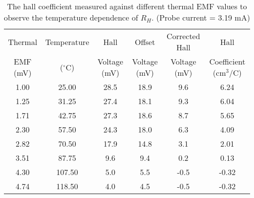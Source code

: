 \begin{table*}[]
    \centering
    \begin{tabular}{|c|c|c|c|c|c|}
    \hline
    Thermal  & Temperature & Hall & Offset & Corrected Hall & Hall \\ 
    EMF (mV) & ($^\circ$C) & Voltage (mV) & Voltage (mV) & Voltage (mV) & Coefficient (cm$^3$/C) \\ \hline
    1.00 & 25.00 & 28.5 & 18.9 & 9.6 & 6.24 \\ \hline
    1.25 & 31.25 & 27.4 & 18.1 & 9.3 & 6.04 \\ \hline
    1.71 & 42.75 & 27.3 & 18.6 & 8.7 & 5.65 \\ \hline
    2.30 & 57.50 & 24.3 & 18.0 & 6.3 & 4.09 \\ \hline
    2.82 & 70.50 & 17.9 & 14.8 & 3.1 & 2.01 \\ \hline
    3.51 & 87.75 & 9.6 & 9.4 & 0.2 & 0.13 \\ \hline
    4.30 & 107.50 & 5.0 & 5.5 & -0.5 & -0.32 \\ \hline
    4.74 & 118.50 & 4.0 & 4.5 & -0.5 & -0.32 \\ \hline
    \end{tabular}
    \caption{The hall coefficient measured against different thermal EMF values to observe the temperature dependence of $R_H$. (Probe current = 3.19 mA)}
    \label{tab:tem}
\end{table*}